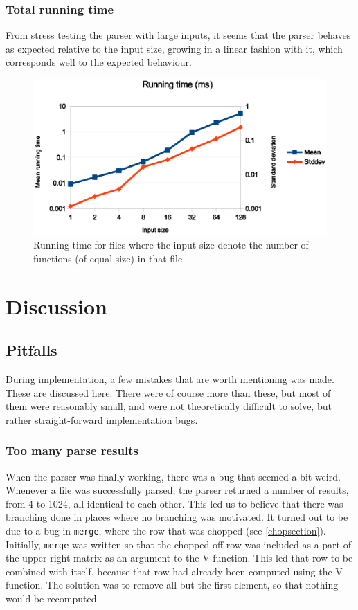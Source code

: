 \documentclass[a4paper,12pt,twosided]{report}
\begin{document}
\subsection{Total running time}
From stress testing the parser with large inputs, it seems that the parser
behaves as expected relative to the input size, growing in a linear fashion with
it, which corresponds well to the expected behaviour.

\begin{figure}
\includegraphics[width=\textwidth]{criterion-1-128.eps}
\caption{\label{criterion}Running time for files where the input size denote the
number of functions (of equal size) in that file}
\end{figure}

%
%
\chapter{Discussion}

\section{Pitfalls}
During implementation, a few mistakes that are worth mentioning was made. These
are discussed here. There were of course more than these, but most of them were
reasonably small, and were not theoretically difficult to solve, but rather
straight-forward implementation bugs. 

\subsection{Too many parse results}
When the parser was finally working, there was a bug that seemed a bit weird.
Whenever a file was successfully parsed, the parser returned a number of
results, from 4 to 1024, all identical to each other. This led us to believe
that there was branching done in places where no branching was motivated. It
turned out to be due to a bug in \texttt{merge}, where the row that was chopped
(see \ref{chopsection}). Initially, \texttt{merge} was written so that the
chopped off row was included as a part of the upper-right matrix as an argument
to the V function. This led that row to be combined with itself, because that
row had already been computed using the V function. The solution was to remove
all but the first element, so that nothing would be recomputed.
\end{document}
